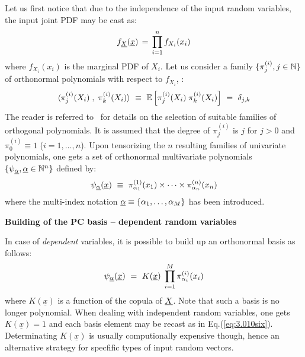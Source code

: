 {  Let us first notice that due to the independence of the input random variables, the input joint PDF may be cast as:
  \begin{equation}\label{eq:3.010qua}
    f_{{\underline{X}}}({\underline{x}}) \, = \, \prod_{i=1}^{n} f_{X_i}(x_{i})
  \end{equation}
  where $f_{X_i}(x_{i})$ is the marginal PDF of $X_i$. Let us consider a family $\{\pi^{(i)}_{j}, j \in {\mathbb N}\}$ of orthonormal polynomials with respect to $f_{X_i}$, \ie:
  \begin{equation}\label{eq:3.010cinq}
    \langle \pi^{(i)}_{j}(X_{i}) \; , \; \pi^{(i)}_{k}(X_{i}) \rangle  \, \, \equiv \, \, {\mathbb E}\left[ \pi^{(i)}_{j}(X_{i}) \;  \pi^{(i)}_{k}(X_{i}) \right] \, \, = \, \, \delta_{j,k}
  \end{equation}
  The reader is referred to~ for details on the selection of suitable families of orthogonal polynomials. It is assumed that the degree of $\pi^{(i)}_{j}$ is $j$ for $j>0$ and $\pi^{(i)}_{0} \equiv 1$ ($i=1,\dots,n$). Upon tensorizing the $n$ resulting families of univariate polynomials, one gets a set of orthonormal multivariate polynomials $\{\psi_{{\underline{\alpha}}} , {\underline{\alpha}} \in {\mathbb N}^n\}$ defined by:
  \begin{equation}\label{eq:3.010six}
    \psi_{{\underline{\alpha}}}({\underline{x}}) \, \, \equiv \,\, \pi^{(1)}_{\alpha_{1}}(x_{1}) \times \cdots \times \pi^{(n)}_{\alpha_{n}}(x_{n})
  \end{equation}
  where the multi-index notation ${\underline{\alpha}} \equiv \{\alpha_{1},\dots,\alpha_{M}\}$ has been introduced.%



  \vspace{3mm}

  \textbf{Building of the PC basis -- dependent random variables} \vspace{2mm}

  In case of \emph{dependent} variables, it is possible to build up an orthonormal basis as follows:
  \begin{equation}\label{eq:3.010six}
    \psi_{{\underline{\alpha}}}({\underline{x}}) \, \, = \,\,  K(\underline{x}) \;\prod_{i=1}^M \pi^{(i)}_{\alpha_{i}}(x_{i})
  \end{equation}
  where $K(\underline{x})$ is a function of the copula of ${\underline{X}}$. Note that such a basis is no longer polynomial. When dealing with independent random variables, one gets $K(\underline{x})=1$ and each basis element may be recast as in Eq.(\ref{eq:3.010six}). Determinating $K(\underline{x})$ is usually computionally expensive though, hence an alternative strategy for specfific types of input random vectors. \\

}
